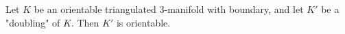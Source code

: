 Let $K$ be an orientable triangulated 3-manifold with boundary, and let $K'$ be a "doubling" of $K$. Then $K'$ is orientable.
